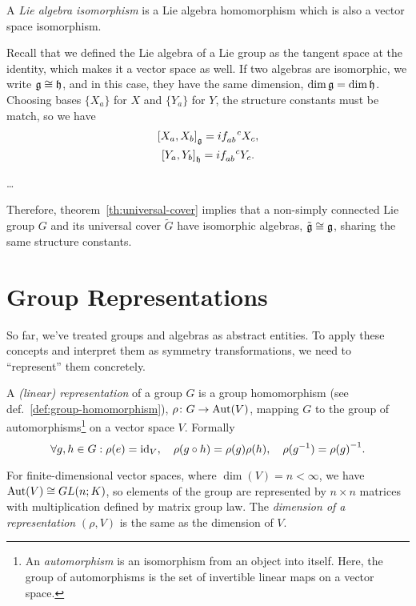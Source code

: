\begin{definition}
    A \emph{Lie algebra isomorphism} is a Lie algebra homomorphism which is also a vector space isomorphism.
\end{definition}

Recall that we defined the Lie algebra of a Lie group as the tangent space at the identity, which makes it a vector space as well. If two algebras are isomorphic, we write $\mathfrak{g} \cong \mathfrak{h}$, and in this case, they have the same dimension, $\dim \mathfrak{g} = \dim \mathfrak{h}$. Choosing bases $\{X_a\}$ for $X$ and $\{Y_a\}$ for $Y$, the structure constants must be match, so we have
\begin{gather*}
    \comm{X_a}{X_b}_\g = i \tensor{f}{_a_b^c} X_c ,\\
    \comm{Y_a}{Y_b}_\h = i \tensor{f}{_a_b^c} Y_c .
\end{gather*}

\begin{mdframed}
\begin{innerproof}
    \color{red} \dots \color{black}
\end{innerproof}
\end{mdframed}

Therefore, theorem~\ref{th:universal-cover} implies that a non-simply connected Lie group $G$ and its universal cover $\tilde{G}$ have isomorphic algebras, $\tilde{\mathfrak{g}} \cong \mathfrak{g}$, sharing the same structure constants.

    

\section{Group Representations}\label{sec:group-representation}
So far, we've treated groups and algebras as abstract entities. To apply these concepts and interpret them as symmetry transformations, we need to “represent” them concretely.

\begin{definition}\label{def:representation}
    A \emph{(linear) representation} of a group $G$ is a group homomorphism (see def.~\ref{def:group-homomorphism}), $\rho \colon G \to \operatorname{Aut}(V)$, mapping $G$ to the group of automorphisms\footnote{An \emph{automorphism} is an isomorphism from an object into itself. Here, the group of automorphisms is the set of invertible linear maps on a vector space.} on a vector space $V$. Formally
    \begin{equation}\label{eq:representation-property}
        \forall g, h \in G: \rho(e) = \operatorname{id}_V, \quad \rho(g \circ h) = \rho(g)\rho(h), \quad \rho(g^{-1}) = {\rho(g)}^{-1} .
    \end{equation}
\end{definition}
For finite-dimensional vector spaces, where $\dim(V) = n < \infty$, we have $\operatorname{Aut}(V) \cong GL(n;K)$, so elements of the group are represented by $n \times n$ matrices with multiplication defined by matrix group law. The \emph{dimension of a representation} $(\rho, V)$ is the same as the dimension of $V$.

